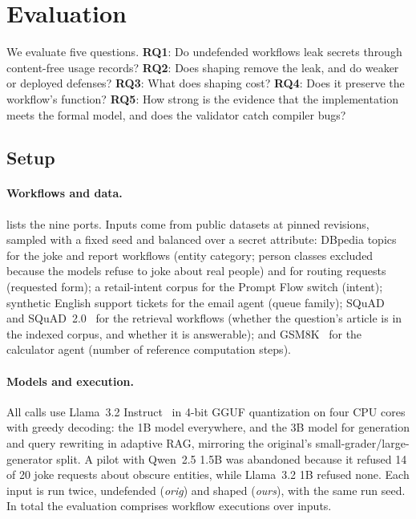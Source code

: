 \section{Evaluation}\label{sec:eval}

We evaluate five questions. \textbf{RQ1}: Do undefended workflows leak secrets through content-free usage records? \textbf{RQ2}: Does shaping remove the leak, and do weaker or deployed defenses? \textbf{RQ3}: What does shaping cost? \textbf{RQ4}: Does it preserve the workflow's function? \textbf{RQ5}: How strong is the evidence that the implementation meets the formal model, and does the validator catch compiler bugs?

\subsection{Setup}\label{sec:eval-setup}

\paragraph{Workflows and data.}  lists the nine ports. Inputs come from public datasets at pinned revisions, sampled with a fixed seed and balanced over a secret attribute: DBpedia topics~\cite{zhang2015charcnn} for the joke and report workflows (entity category; person classes excluded because the models refuse to joke about real people) and for routing requests (requested form); a retail-intent corpus for the Prompt Flow switch (intent); synthetic English support tickets for the email agent (queue family); SQuAD~\cite{rajpurkar2016squad} and SQuAD~2.0~\cite{rajpurkar2018squad2} for the retrieval workflows (whether the question's article is in the indexed corpus, and whether it is answerable); and GSM8K~\cite{cobbe2021gsm8k} for the calculator agent (number of reference computation steps).

\paragraph{Models and execution.} All calls use Llama~3.2 Instruct~\cite{meta2024llama32} in 4-bit GGUF quantization on four CPU cores with greedy decoding: the 1B model everywhere, and the 3B model for generation and query rewriting in adaptive RAG, mirroring the original's small-grader/large-generator split. A pilot with Qwen~2.5 1.5B was abandoned because it refused 14 of 20 joke requests about obscure entities, while Llama~3.2 1B refused none. Each input is run twice, undefended (\emph{orig}) and shaped (\emph{ours}), with the same run seed. In total the evaluation comprises \resRuns{} workflow executions over \resInputs{} inputs.

